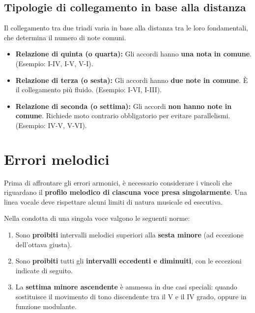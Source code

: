 \subsection{Tipologie di collegamento in base alla distanza}

Il collegamento tra due triadi varia in base alla distanza tra le loro fondamentali, che determina il numero di note comuni.

\begin{itemize}
	\item \textbf{Relazione di quinta (o quarta):} Gli accordi hanno \textbf{una nota in comune}. (Esempio: I-IV, I-V, V-I).
	\item \textbf{Relazione di terza (o sesta):} Gli accordi hanno \textbf{due note in comune}. È il collegamento più fluido. (Esempio: I-VI, I-III).
	\item \textbf{Relazione di seconda (o settima):} Gli accordi \textbf{non hanno note in comune}. Richiede moto contrario obbligatorio per evitare parallelismi. (Esempio: IV-V, V-VI).
\end{itemize}

\section{Errori melodici}
\label{sec:errori_melodici}

Prima di affrontare gli errori armonici, è necessario considerare i vincoli che riguardano il \textbf{profilo melodico di ciascuna voce presa singolarmente}. Una linea vocale deve rispettare alcuni limiti di natura musicale ed esecutiva.

\begin{regola}
	\label{reg:limiti_melodici}
	Nella condotta di una singola voce valgono le seguenti norme:
	\begin{enumerate}
		\item Sono \textbf{proibiti} intervalli melodici superiori alla \textbf{sesta minore} (ad eccezione dell'ottava giusta).
		\item Sono \textbf{proibiti} tutti gli \textbf{intervalli eccedenti e diminuiti}, con le eccezioni indicate di seguito.
		\item La \textbf{settima minore ascendente} è ammessa in due casi speciali: quando sostituisce il movimento di tono discendente tra il V e il IV grado, oppure in funzione modulante.
	\end{enumerate}
\end{regola}

